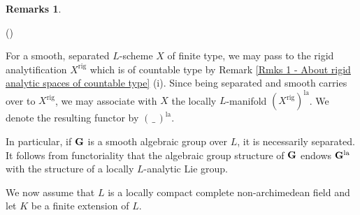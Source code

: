 \documentclass[a4paper, reqno, 10pt]{amsart}
\theoremstyle{definition}
\newtheorem{remarks}[theorem]{Remarks}
\newenvironment{altenumerate}
	{\begin{list}
		{\textup{(\theenumi)} }
		{\usecounter{enumi}
			\setlength{\labelwidth}{0pt}
			\setlength{\labelsep}{0pt}
			\setlength{\leftmargin}{0pt}
			\setlength{\itemsep}{0pt}
			\setlength{\topsep}{0pt}
		\renewcommand{\theenumi}{\roman{enumi}}
		}}
	{\end{list}}
\numberwithin{equation}{section}
\newcommand{\blank}{{\,\_\,}}
\newcommand{\la}{{\mathrm{la}}}
\newcommand{\rig}{{\mathrm{rig}}}
\newcommand{\bG}{{\mathrm{\bf G}}}
\begin{document}
\begin{remarks}\label{Rmks 1 - Associating a locally analytic manifold with a scheme}
	\begin{altenumerate}
		\item
		For a smooth, separated $L$-scheme $X$ of finite type, we may pass to the rigid analytification $X^\rig$ which is of countable type by Remark \ref{Rmks 1 - About rigid analytic spaces of countable type} (i).
		Since being separated and smooth carries over to $X^\rig$, we may associate with $X$ the locally $L$-manifold $(X^\rig)^\la$.
		We denote the resulting functor by $(\blank)^\la$.
		\item
		In particular, if $\bG$ is a smooth algebraic group over $L$, it is necessarily separated.
		It follows from functoriality that the algebraic group structure of $\bG$ endows $\bG^\la$ with the structure of a locally $L$-analytic Lie group.
	\end{altenumerate}
\end{remarks}



We now assume that $L$ is a locally compact complete non-archimedean field and let $K$ be a finite extension of $L$.
\end{document}
